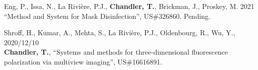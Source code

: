 \documentclass[12pt,letterpaper]{article}
\begin{document}
\nocite{*}
\setlength{}
\printbibliography[heading=none, type=article, sorting=ynt, resetnumbers=true]


\begin{benumerate}{2}
  \item{Eng, P., Issa, N., La Rivi\`ere, P.J., \textbf{Chandler, T.}, Brickman, J., Proskey, M. \hfill 2021\\ ``Method and System for Mask Disinfection'', US\#326860. Pending. }
\item{Shroff, H., Kumar, A., Mehta, S., La Rivi\`ere, P.J., Oldenbourg, R., Wu, Y., \hfill 2020/12/10\\ \textbf{Chandler, T.}, ``Systems and methods for three-dimensional fluorescence\\ polarization via multiview imaging'', US\#16616891.}
\end{benumerate}
  
\end{document}
